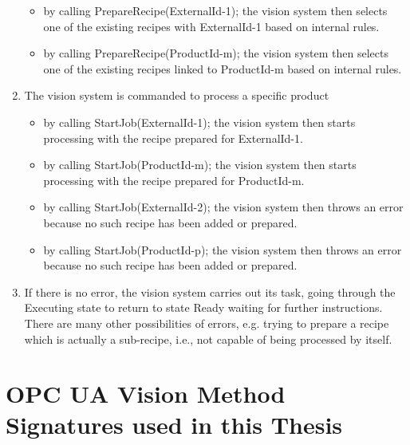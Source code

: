 \begin{enumerate}
\begin{itemize}
    \item by calling PrepareRecipe(ExternalId-1); the vision system then selects one of the existing recipes with 
    ExternalId-1 based on internal rules.
    \item by calling PrepareRecipe(ProductId-m); the vision system then selects one of the existing recipes 
    linked to ProductId-m based on internal rules. 
    \end{itemize}
    \item The vision system is commanded to process a specific product
    \begin{itemize}
        \item by calling StartJob(ExternalId-1); the vision system then starts processing with the recipe prepared for ExternalId-1. 
        \item by calling StartJob(ProductId-m); the vision system then starts processing with the recipe prepared for ProductId-m. 
        \item by calling StartJob(ExternalId-2); the vision system then throws an error because no such recipe has 
        been added or prepared.
        \item by calling StartJob(ProductId-p); the vision system then throws an error because no such recipe has 
        been added or prepared. 
    \end{itemize}
    \item If there is no error, the vision system carries out its task, going through the Executing state to return to state Ready waiting for further instructions. There are many other possibilities of errors, e.g. trying to prepare a recipe which is actually a sub-recipe, i.e., not capable of being processed by itself. 
\end{enumerate}

\chapter{OPC UA Vision Method Signatures used in this Thesis}

\endinput
